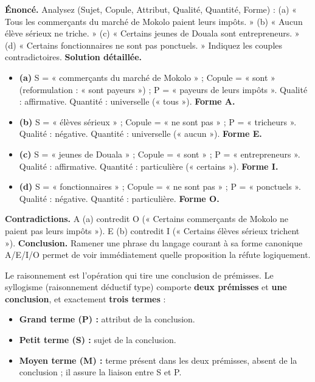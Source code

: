 \documentclass[11pt]{article}
\newcommand{\cle}[1]{{\popxbold\color{popdark}#1}}
\newcounter{popsec}
\newcounter{popsub}
\newcommand{\courssub}[1]{%
  \stepcounter{popsub}%
  \par\vspace{9pt}\noindent{\popxbold\fontsize{11.5}{13}\selectfont\color{popink}{\color{poporange}\thepopsec.\thepopsub}\hspace{6pt}#1}\par\nopagebreak\vspace{4pt}
}
\begin{document}
\begin{exoresolu}
\textbf{Énoncé.} Analysez (Sujet, Copule, Attribut, Qualité, Quantité, Forme) : (a) « Tous les commerçants du marché de Mokolo paient leurs impôts. » (b) « Aucun élève sérieux ne triche. » (c) « Certains jeunes de Douala sont entrepreneurs. » (d) « Certains fonctionnaires ne sont pas ponctuels. » Indiquez les couples contradictoires.
\tcblower
\textbf{Solution détaillée.}
\begin{itemize}
\item \textbf{(a)} S = « commerçants du marché de Mokolo » ; Copule = « sont » (reformulation : « sont payeurs ») ; P = « payeurs de leurs impôts ». Qualité : affirmative. Quantité : universelle (« tous »). \textbf{Forme A.}
\item \textbf{(b)} S = « élèves sérieux » ; Copule = « ne sont pas » ; P = « tricheurs ». Qualité : négative. Quantité : universelle (« aucun »). \textbf{Forme E.}
\item \textbf{(c)} S = « jeunes de Douala » ; Copule = « sont » ; P = « entrepreneurs ». Qualité : affirmative. Quantité : particulière (« certains »). \textbf{Forme I.}
\item \textbf{(d)} S = « fonctionnaires » ; Copule = « ne sont pas » ; P = « ponctuels ». Qualité : négative. Quantité : particulière. \textbf{Forme O.}
\end{itemize}
\textbf{Contradictions.} A (a) contredit O (« Certains commerçants de Mokolo ne paient pas leurs impôts »). E (b) contredit I (« Certains élèves sérieux trichent »).
\textbf{Conclusion.} Ramener une phrase du langage courant à sa forme canonique A/E/I/O permet de voir immédiatement quelle proposition la réfute logiquement.
\end{exoresolu}

\courssub{Le raisonnement}

\begin{definition}
Le \cle{raisonnement} est l'opération qui tire une conclusion de prémisses. Le \cle{syllogisme} (raisonnement déductif type) comporte \textbf{deux prémisses} et \textbf{une conclusion}, et exactement \textbf{trois termes} :
\begin{itemize}
\item \textbf{Grand terme (P) :} attribut de la conclusion.
\item \textbf{Petit terme (S) :} sujet de la conclusion.
\item \textbf{Moyen terme (M) :} terme présent dans les deux prémisses, absent de la conclusion ; il assure la liaison entre S et P.
\end{itemize}
\end{definition}
\end{document}
